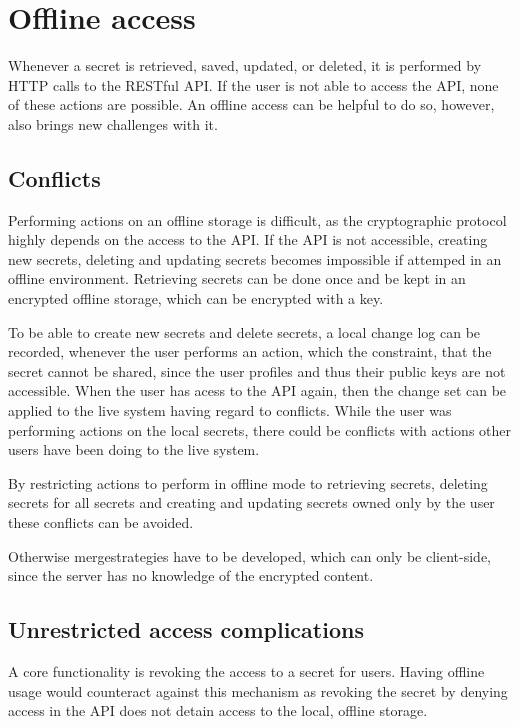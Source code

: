 \section{Offline access}

Whenever a secret is retrieved, saved, updated, or deleted, it is performed by
HTTP calls to the RESTful API. If the user is not able to access the API, none
of these actions are possible. An offline access can be helpful to do so, however,
also brings new challenges with it.

\subsection{Conflicts}

Performing actions on an offline storage is difficult, as the cryptographic
protocol highly depends on the access to the API. If the API is not accessible,
creating new secrets, deleting and updating secrets becomes impossible if
attemped in an offline environment. Retrieving secrets can be done once and be
kept in an encrypted offline storage, which can be encrypted with a key.

To be able to create new secrets and delete secrets, a local change log can be
recorded, whenever the user performs an action, which the constraint, that the
secret cannot be shared, since the user profiles and thus their public keys are
not accessible. When the user has acess to the API again, then the change set
can be applied to the live system having regard to conflicts. While the user
was performing actions on the local secrets, there could be conflicts with
actions other users have been doing to the live system.

By restricting actions to perform in offline mode to retrieving secrets,
deleting secrets for all secrets and creating and updating secrets owned only
by the user these conflicts can be avoided.

Otherwise mergestrategies have to be developed, which can only be client-side,
since the server has no knowledge of the encrypted content.

\subsection{Unrestricted access complications}
\label{sub_sec:unrestricted_access}

A core functionality is revoking the access to a secret for users. Having
offline usage would counteract against this mechanism as revoking the secret by
denying access in the API does not detain access to the local, offline storage.

